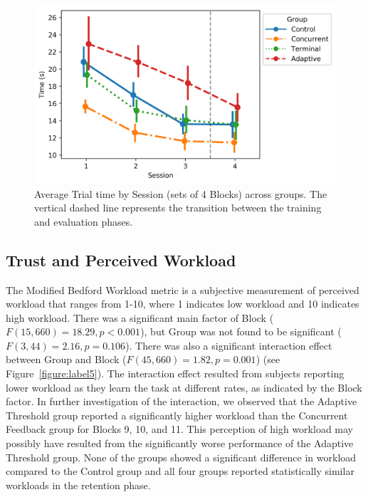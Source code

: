 \begin{figure}[bt!]
	\centering
	\includegraphics[height=.4\textwidth]{figures/EMG/TrialTime_session}
	\caption[Average Trial time by Session across groups]{Average Trial time by Session (sets of 4 Blocks) across groups.
		The vertical dashed line represents the transition between the training and evaluation phases.}
	\label{figure:label4}
\end{figure}

\subsection{Trust and Perceived Workload}
The Modified Bedford Workload metric is a subjective measurement of perceived workload that ranges from 1-10, where 1 indicates low workload and 10 indicates high workload.
There was a significant main factor of Block ($F(15, 660) = 18.29, p < 0.001$), but Group was not found to be significant ($F(3, 44) = 2.16, p = 0.106$).
There was also a significant interaction effect between Group and Block ($F(45, 660)= 1.82, p = 0.001$) (see Figure~\ref{figure:label5}).
The interaction effect resulted from subjects reporting lower workload as they learn the task at different rates, as indicated by the Block factor.
In further investigation of the interaction, we observed that the Adaptive Threshold group reported a significantly higher workload than the Concurrent Feedback group for Blocks 9, 10, and 11.
This perception of high workload may possibly have resulted from the significantly worse performance of the Adaptive Threshold group.
None of the groups showed a significant difference in workload compared to the Control group and all four groups reported statistically similar workloads in the retention phase.

